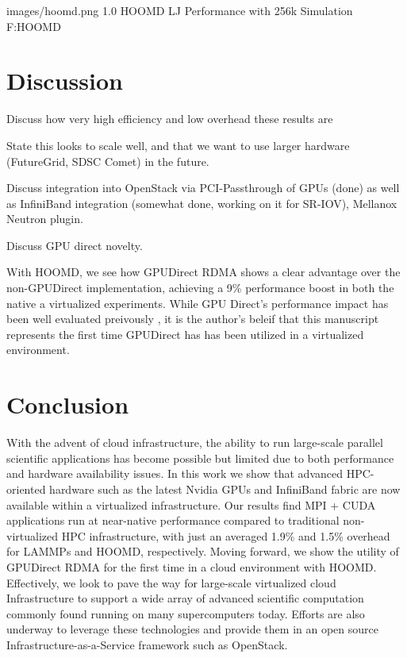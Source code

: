 \documentclass[times,10pt,twocolumn,conference]{IEEEtran}
\begin{document}
  {images/hoomd.png}
  {1.0}
  {HOOMD LJ Performance with 256k Simulation}
  {F:HOOMD}


\section{Discussion}

Discuss how very high efficiency and low overhead these results are

State this looks to scale well, and that we want to use larger hardware (FutureGrid, SDSC Comet) in the future.

Discuss integration into OpenStack via PCI-Passthrough of GPUs (done) as well as InfiniBand integration (somewhat done, working on it for SR-IOV), Mellanox Neutron plugin. 

Discuss GPU direct novelty.

With HOOMD, we see how GPUDirect RDMA shows a clear advantage over the non-GPUDirect implementation, achieving a 9\% performance boost in both the native a virtualized experiments.  While GPU Direct's performance impact has been well evaluated preivously \cite{GPUDirect}, it is the author's beleif that this manuscript represents the first time GPUDirect has has been utilized in a virtualized environment.  



\section{Conclusion}

With the advent of cloud infrastructure, the ability to run large-scale parallel scientific applications has become possible but limited due to both performance and hardware availability issues. In this work we show that advanced HPC-oriented hardware such as the latest Nvidia GPUs and InfiniBand fabric are now available within a virtualized infrastructure. Our results find MPI + CUDA applications run at near-native performance compared to traditional non-virtualized HPC infrastructure, with just an averaged 1.9\% and 1.5\% overhead for LAMMPs and HOOMD, respectively. Moving forward, we show the utility of GPUDirect RDMA for the first time in a cloud environment with HOOMD.  Effectively, we look to pave the way for large-scale virtualized cloud Infrastructure to support a wide array of advanced scientific computation commonly found running on many supercomputers today.  Efforts are also underway to leverage these technologies and provide them in an open source Infrastructure-as-a-Service framework such as OpenStack.  










\end{document}
